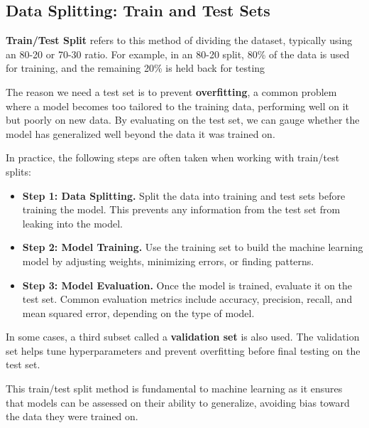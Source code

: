 \subsection{Data Splitting: Train and Test Sets}
\begin{flushleft}
\large \textbf{Train/Test Split} refers to this method of dividing the dataset, typically using an 80-20 or 70-30 ratio. For example, in an 80-20 split, 80\% of the data is used for training, and the remaining 20\% is held back for testing


The reason we need a test set is to prevent \textbf{overfitting}, a common problem where a model becomes too tailored to the training data, performing well on it but poorly on new data. By evaluating on the test set, we can gauge whether the model has generalized well beyond the data it was trained on.

In practice, the following steps are often taken when working with train/test splits:
\begin{itemize}
    \item \textbf{Step 1: Data Splitting.} Split the data into training and test sets before training the model. This prevents any information from the test set from leaking into the model.
    \item \textbf{Step 2: Model Training.} Use the training set to build the machine learning model by adjusting weights, minimizing errors, or finding patterns.
    \item \textbf{Step 3: Model Evaluation.} Once the model is trained, evaluate it on the test set. Common evaluation metrics include accuracy, precision, recall, and mean squared error, depending on the type of model.
\end{itemize}

In some cases, a third subset called a \textbf{validation set} is also used. The validation set helps tune hyperparameters and prevent overfitting before final testing on the test set.

This train/test split method is fundamental to machine learning as it ensures that models can be assessed on their ability to generalize, avoiding bias toward the data they were trained on.
\end{flushleft}
